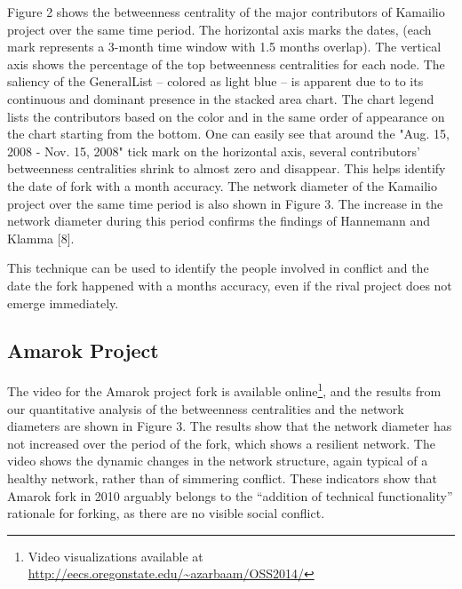 \documentclass[ifip]{svmult}
\begin{document}

Figure 2 shows the betweenness centrality of the major contributors of Kamailio project over the same time period. The horizontal axis marks the dates, (each mark represents a 3-month time window with 1.5 months overlap). The vertical axis shows the percentage of the top betweenness centralities for each node. The saliency of the GeneralList -- colored as light blue -- is apparent due to to its continuous and dominant presence in the stacked area chart. The chart legend lists the contributors based on the color and in the same order of appearance on the chart starting from the bottom. One can easily see that around the "Aug. 15, 2008 - Nov. 15, 2008" tick mark on the horizontal axis, several contributors' betweenness centralities shrink to almost zero and disappear. This helps identify the date of fork with a month accuracy. The network diameter of the Kamailio project over the same time period is also shown in Figure 3. The increase in the network diameter during this period confirms the findings of Hannemann and Klamma [8]. 

This technique can be used to identify the people involved in conflict and the date the fork happened with a months accuracy, even if the rival project does not emerge immediately.
\subsection{Amarok Project}
The video for the Amarok project fork is available online\footnote{Video visualizations available at \href{http://eecs.oregonstate.edu/~azarbaam/OSS2014/}{http://eecs.oregonstate.edu/\textasciitilde azarbaam/OSS2014/}}, and the results from our quantitative analysis of the betweenness centralities and the network diameters are shown in Figure 3. The results show that the network diameter has not increased over the period of the fork, which shows a resilient network. The video shows the dynamic changes in the network structure, again typical of a healthy network, rather than of simmering conflict. These indicators show that Amarok fork in 2010 arguably belongs to the ``addition of technical functionality'' rationale for forking, as there are no visible social conflict. 
\end{document}
